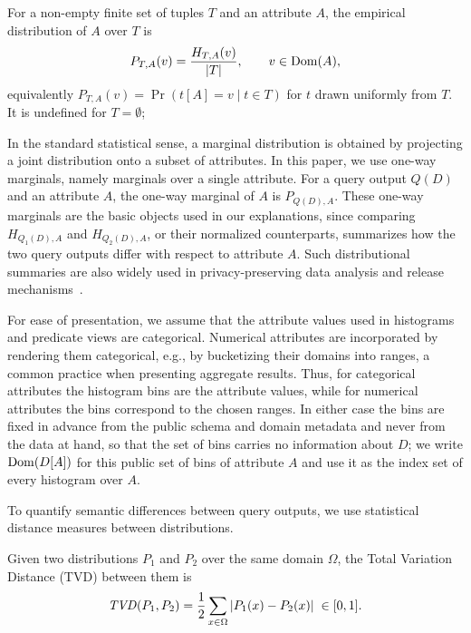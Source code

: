 \begin{definition}
\label{def:empirical-distribution}
For a non-empty finite set of tuples $T$ and an attribute $A$, the empirical
distribution of $A$ over $T$ is
\[
P_{T,A}(v) = \frac{H_{T,A}(v)}{|T|},
\qquad v\in\operatorname{Dom}(A),
\]
equivalently $P_{T,A}(v)=\Pr\left(t[A]=v \mid t\in T\right)$ for $t$ drawn uniformly
from $T$. It is undefined for $T=\emptyset$; 
\end{definition}

In the standard statistical sense, a marginal distribution is obtained by
projecting a joint distribution onto a subset of attributes. In this
paper, we use one-way marginals, namely marginals over a single
attribute.
For a query output $Q(D)$ and an attribute $A$, the one-way marginal of
$A$ is $P_{Q(D),A}$.
These one-way marginals are the basic objects used in our explanations, since
comparing $H_{Q_1(D),A}$ and $H_{Q_2(D),A}$, or their normalized counterparts,
summarizes how the two query outputs differ with respect to attribute $A$.
Such distributional summaries are also widely used in privacy-preserving data
analysis and release mechanisms~\cite{TheAlgFoundDP2014}.

For ease of presentation, we assume that the attribute values used in
histograms and predicate views are categorical. Numerical attributes are
incorporated by rendering them categorical, e.g., by bucketizing their
domains into ranges, a common practice when presenting aggregate
results. Thus, for categorical attributes the histogram bins are the
attribute values, while for numerical attributes the bins correspond to
the chosen ranges.
In either case the bins are fixed in advance from the public schema and domain
metadata and never from the data at hand, so that the set of bins carries no
information about $D$; we write $\operatorname{Dom}(D[A])$ for this public set of bins of
attribute $A$ and use it as the index set of every histogram over $A$.



To quantify semantic differences between query outputs, we use statistical distance
measures between distributions.

\begin{definition}
\label{def:tvd}
Given two distributions $P_1$ and $P_2$ over the same domain $\Omega$, the Total
Variation Distance (TVD) between them is
\[
\mathit{TVD}(P_1,P_2)
=
\frac{1}{2}
\sum_{x\in\Omega}
|P_1(x)-P_2(x)| \; \in [0,1].
\]
\end{definition}


